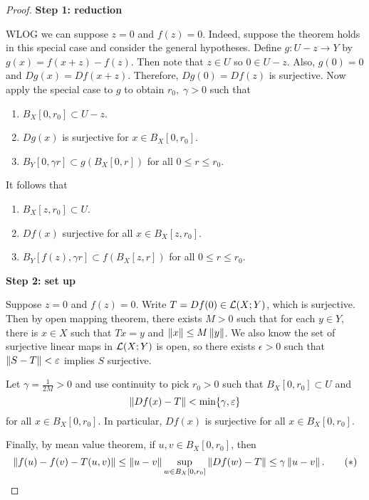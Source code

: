 \documentclass[a4paper]{article}
\begin{document}
\begin{proof}
\textbf{Step 1: reduction} 

WLOG we can suppose $z = 0$ and $f(z) = 0$. Indeed, suppose 
the theorem holds in this special case and consider 
the general hypotheses. Define $g : U - z \to Y$ by 
$g(x) = f(x + z) - f(z)$. Then note that $z \in U$
so $0 \in U - z$. Also, $g(0) = 0$ and $Dg(x) = Df(x + z)$.
Therefore, $Dg(0) = Df(z)$ is surjective. Now apply the special
case to $g$ to obtain $r_0, \; \gamma > 0$ such that 
\begin{enumerate}
  \item $B_X [0, r_0] \subset U - z$. 
  \item $Dg(x)$ is surjective for $x \in B_X [0, r_0]$.
  \item $B_Y [0, \gamma r] \subset g(B_X [0, r])$ 
  for all $0 \leq r \leq r_0$.
\end{enumerate}
It follows that 
\begin{enumerate}
  \item $B_X[z, r_0] \subset U$.
  \item $Df(x)$ surjective for all $x \in B_X[z, r_0]$.
  \item $B_Y[f(z), \gamma r] \subset f(B_X[z, r])$ for all
  $0 \leq r \leq r_0$.
\end{enumerate}

\textbf{Step 2: set up} 

Suppose $z = 0$ and $f(z) = 0$. Write $T = Df(0) \in \mathcal{L}(X; Y)$,
which is surjective. Then by open mapping theorem, there 
exists $M > 0$ such that for each $y \in Y$, there is 
$x \in X$ such that $T x = y$ and $\left\lVert x\right\rVert \leq M \left\lVert y\right\rVert$.
We also know the set of surjective linear maps 
in $\mathcal{L}(X; Y)$ is open, so there exists $\epsilon > 0$ such that 
$\left\lVert S - T\right\rVert < \varepsilon$ implies $S$ surjective. 

Let $\gamma = \frac{1}{2 M} > 0$ and use continuity to pick 
$r_0 > 0$ such that $B_X[0, r_0] \subset U$ and 
\[
\left\lVert Df(x) - T\right\rVert < \min\{\gamma, \varepsilon\}
\]
for all $x \in B_X[0, r_0]$. In particular, $Df(x)$
is surjective for all $x \in B_X [0, r_0]$. 

Finally, by mean value theorem, if $u, v \in B_X[0, r_0]$,
then 
\begin{equation*}
  \left\lVert f(u) - f(v) - T(u, v)\right\rVert 
  \leq \left\lVert u - v\right\rVert \sup_{w \in B_X[0, r_0]} \left\lVert Df(w) - T\right\rVert 
  \leq \gamma \left\lVert u - v\right\rVert.
  \tag{$*$}
\end{equation*}
\end{proof}
\end{document}
